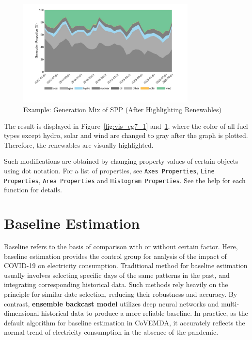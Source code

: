 \documentclass[11pt]{article}
\newcommand{\covemda}{CoVEMDA}
\numberwithin{equation}{section}
\numberwithin{table}{section}
\numberwithin{figure}{section}
\begin{document}
\begin{figure}
  \centering
  \noindent\includegraphics[width=0.8\textwidth]{figures/visualization_example7_2.jpg}
  \caption{Example: Generation Mix of SPP (After Highlighting Renewables)} \label{fig:vis_eg7_2}
\end{figure}

The result is displayed in Figure~\ref{fig:vis_eg7_1} and~\ref{fig:vis_eg7_2}, where the color of all fuel types except hydro, solar and wind are changed to gray after the graph is plotted. Therefore, the renewables are visually highlighted.

Such modifications are obtained by changing property values of certain objects using dot notation. For a list of properties, see \verb!Axes Properties!, \verb!Line Properties!, \verb!Area Properties! and \verb!Histogram Properties!. See the help for each function for details.





\newpage
\section{Baseline Estimation} \label{sec:baseline}

Baseline refers to the basis of comparison with or without certain factor. Here, baseline estimation provides the control group for analysis of the impact of COVID-19 on electricity consumption. Traditional method for baseline estimation usually involves selecting specific days of the same patterns in the past, and integrating corresponding historical data. Such methods rely heavily on the principle for similar date selection, reducing their robustness and accuracy. By contrast, \textbf{ensemble backcast model} utilizes deep neural networks and multi-dimensional historical data to produce a more reliable baseline. In practice, as the default algorithm for baseline estimation in \covemda{}, it accurately reflects the normal trend of electricity consumption in the absence of the pandemic.
\end{document}
